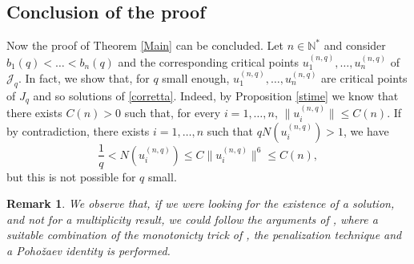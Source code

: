 \documentclass[11pt,leqno,twoside,reqno]{amsart}
\numberwithin{equation}{section}
\newtheorem{remark}[theorem]{Remark}
\begin{document}
\subsection{Conclusion of the proof}
Now the proof of Theorem  \ref{Main} can be concluded.
Let $n\in\mathbb{N}^*$ and consider $b_{1}(q)<\ldots< b_{n}(q)$ 
and the corresponding critical points ${u}^{(n,q)}_1,\ldots,{u}^{(n,q)}_n$ of ${\mathcal{J}}_q$. In fact, we show that, for $q$ small enough, 
${u}^{(n,q)}_1,\ldots,{u}^{(n,q)}_n$ are critical points of $J_q$ and so solutions of \eqref{corretta}.  
Indeed, by Proposition \ref{stime} we know that there exists $C(n)>0$ such that, for every $i=1,\ldots,n$,  $\|{u}^{(n,q)}_i\|{\leqslant} C(n)$.
If by contradiction, there exists $i=1, \ldots, n$ such that $q N({u}^{(n,q)}_i) > 1$, we have
\[
\frac{1}{q} < N({u}^{(n,q)}_i) {\leqslant} C \|{u}^{(n,q)}_i\|^6 {\leqslant}  C(n),
\]
but this is not possible for $q$ small.

\begin{remark}
We observe that, if we were looking for the existence of a solution, and not for a multiplicity result, we could follow the arguments 
of \cite{ADP1}, where a suitable combination of the monotonicty trick of \cite{JJ}, the penalization technique and a Poho\v{z}aev identity 
is performed. 
\end{remark}
\end{document}
